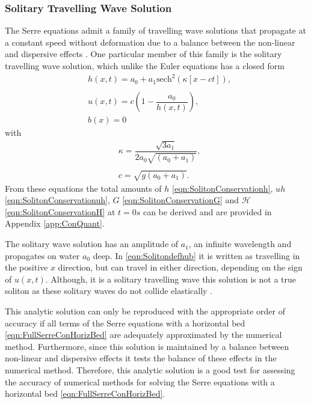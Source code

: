 \subsubsection{Solitary Travelling Wave Solution}
The Serre equations admit a family of travelling wave solutions that propagate at a constant speed without deformation due to a balance between the non-linear and dispersive effects \cite{El-etal-2006}. One particular member of this family is the solitary travelling wave solution, which unlike the Euler equations has a closed form
\begin{subequations}
	\begin{align}
	&h(x,t) = a_0 + a_1\text{sech}^2\left(\kappa \left[x - ct\right]\right), \\  \nonumber \\
	&u(x,t) = c\left(1 - \dfrac{a_0}{h(x,t)}\right), \\
	&b(x) = 0
	\end{align}
	\label{eqn:Solitondefhub}
\end{subequations}
with
\begin{align*}
&\kappa = \dfrac{\sqrt{3a_1}}{2 a_0\sqrt{\left(a_0 + a_1\right)}}, \\ \\
&c = \sqrt{g(a_0 + a_1)}.
\end{align*}
From these equations the total amounts of $h$ \eqref{eqn:SolitonConservationh}, $uh$ \eqref{eqn:SolitonConservationuh}, $G$ \eqref{eqn:SolitonConservationG} and $\mathcal{H}$ \eqref{eqn:SolitonConservationH} at $t=0s$ can be derived and are provided in Appendix \ref{app:ConQuant}.

The solitary wave solution has an amplitude of $a_1$, an infinite wavelength and propagates on water $a_0$ deep. In \eqref{eqn:Solitondefhub} it is written as travelling in the positive $x$ direction, but can travel in either direction, depending on the sign of $u(x,t)$. Although, it is a solitary travelling wave this solution is not a true soliton as these solitary waves do not collide elastically \cite{Dutykh-etal-2013-761}. 

This analytic solution can only be reproduced with the appropriate order of accuracy if all terms of the Serre equations with a horizontal bed \eqref{eqn:FullSerreConHorizBed} are adequately approximated by the numerical method. Furthermore, since this solution is maintained by a balance between non-linear and dispersive effects it tests the balance of these effects in the numerical method. Therefore, this analytic solution is a good test for assessing the accuracy of numerical methods for solving the Serre equations with a horizontal bed \eqref{eqn:FullSerreConHorizBed}.

